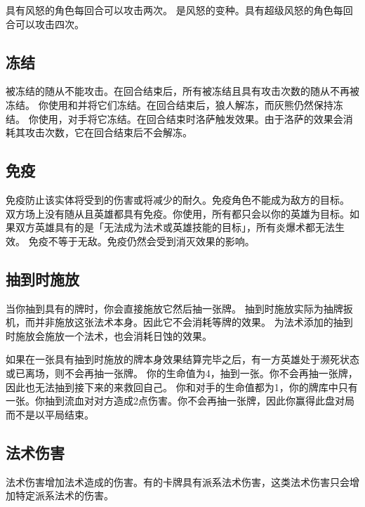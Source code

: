 具有风怒的角色每回合可以攻击两次。
\notice {}是风怒的变种。具有超级风怒的角色每回合可以攻击四次。

\subsection{冻结}
\label{freeze}

被冻结的随从不能攻击。在回合结束后，所有被冻结且具有攻击次数的随从不再被冻结。
\example 你使用和并将它们冻结。在回合结束后，狼人解冻，而灰熊仍然保持冻结。
\example 你使用，对手将它冻结。在回合结束时洛萨触发效果。由于洛萨的效果会消耗其攻击次数，它在回合结束后不会解冻。

\subsection{免疫}
\label{immune}

免疫防止该实体将受到的伤害或将减少的耐久。免疫角色不能成为敌方的目标。
\example 双方场上没有随从且英雄都具有免疫。你使用，所有都只会以你的英雄为目标。如果双方英雄具有的是「无法成为法术或英雄技能的目标」，所有炎爆术都无法生效。
\notice 免疫不等于无敌。免疫仍然会受到消灭效果的影响。

\subsection{抽到时施放}
\label{cast-when-drawn}

当你抽到具有的牌时，你会直接施放它然后抽一张牌。
\notice 抽到时施放实际为抽牌扳机，而并非施放这张法术本身。因此它不会消耗等牌的效果。
\exception {}为法术添加的抽到时施放会施放一个法术，也会消耗日蚀的效果。

如果在一张具有抽到时施放的牌本身效果结算完毕之后，有一方英雄处于濒死状态或已离场，则不会再抽一张牌。
\example 你的生命值为4，抽到一张。你不会再抽一张牌，因此也无法抽到接下来的来救回自己。
\example 你和对手的生命值都为1，你的牌库中只有一张。你抽到流血对对方造成2点伤害。你不会再抽一张牌，因此你赢得此盘对局而不是以平局结束。

\subsection{法术伤害}
\label{spell-damage}

法术伤害增加法术造成的伤害。有的卡牌具有派系法术伤害，这类法术伤害只会增加特定派系法术的伤害。

